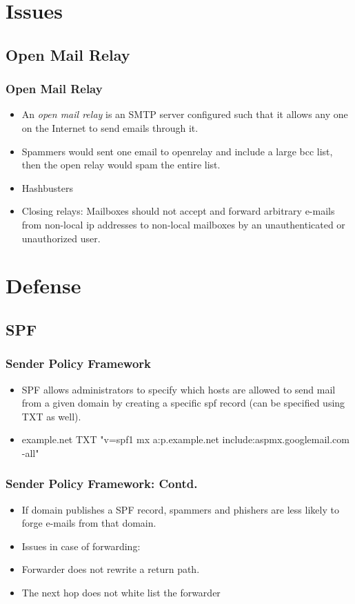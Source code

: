 \documentclass{beamer}
\begin{document}
\section{Issues}
\subsection{Open Mail Relay}
\begin{frame}
  \frametitle{Open Mail Relay}
  \begin{itemize}
    \item An \emph{open mail relay} is an SMTP server configured such that it allows any one on the Internet to send emails through it. 
    \item Spammers would sent one email to openrelay and include a large bcc list, then the open relay would spam the entire list.
    \item Hashbusters
    \item Closing relays: Mailboxes should not accept and forward arbitrary e-mails from non-local ip addresses to non-local mailboxes by an unauthenticated or unauthorized user.
    
  \end{itemize}
\end{frame}
\section{Defense}
\subsection{SPF}
\begin{frame}
  \frametitle{Sender Policy Framework}
  \begin{itemize}
    \item SPF allows administrators to specify which hosts are allowed to send mail from a given domain by creating a specific spf record (can be specified using TXT as well).
    \item example.net TXT "v=spf1 mx a:p.example.net include:aspmx.googlemail.com -all"
  \end{itemize}
\end{frame}
\begin{frame}
  \frametitle{Sender Policy Framework: Contd.}
  \begin{itemize}
    \item If domain publishes a SPF record, spammers and phishers are less likely to forge e-mails from that domain. 
    \item Issues in case of forwarding:
    \item Forwarder does not rewrite a return path.
    \item The next hop does not white list the forwarder
  \end{itemize}
\end{frame}
\end{document}
